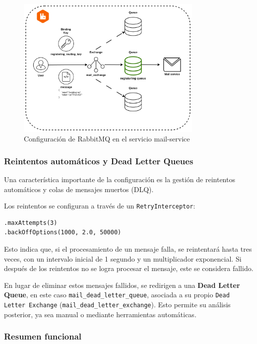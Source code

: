 \begin{figure}[H]
    \centering
    \includegraphics[width=0.8\textwidth]{figures/07_rabbit.png}
    \caption{Configuración de RabbitMQ en el servicio mail-service}
    \label{fig:rabbitmq-config}
\end{figure}

\subsubsection{Reintentos automáticos y Dead Letter Queues}

Una característica importante de la configuración es la gestión de reintentos automáticos y colas de mensajes muertos (DLQ).

Los reintentos se configuran a través de un \texttt{RetryInterceptor}:
\begin{verbatim}
.maxAttempts(3)
.backOffOptions(1000, 2.0, 50000)
\end{verbatim}
Esto indica que, si el procesamiento de un mensaje falla, se reintentará hasta tres veces, con un intervalo inicial de 1 segundo y un multiplicador exponencial. Si después de los reintentos no se logra procesar el mensaje, este se considera fallido.

En lugar de eliminar estos mensajes fallidos, se redirigen a una \textbf{Dead Letter Queue}, en este caso \texttt{mail\_dead\_letter\_queue}, asociada a su propio \texttt{Dead Letter Exchange} (\texttt{mail\_dead\_letter\_exchange}). Esto permite su análisis posterior, ya sea manual o mediante herramientas automáticas.

\subsubsection{Resumen funcional}

